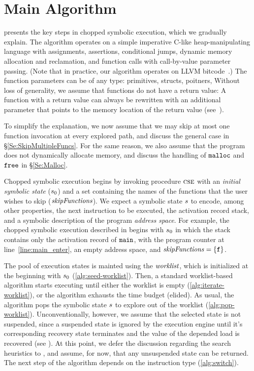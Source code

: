 
\section{Main Algorithm}\label{section:main-algorithm}

 presents the key steps in chopped
symbolic execution, which we gradually explain. The algorithm operates
on a simple imperative C-like heap-manipulating language with
assignments, assertions, conditional jumps, dynamic memory allocation
and reclamation, and function calls with call-by-value parameter
passing.
(Note that in practice, our algorithm operates on LLVM bitcode~\cite{llvm}.)
The function parameters can be of any type: primitives, structs, poitners, \etc
Without loss of generality, we assume that functions do not have a return value:
A function with a return value can always be rewritten with an additional parameter 
that points to the memory location of the return value (see~).

To simplify the explanation, we now
assume that we may skip at most one function invocation at every
explored path, and discuss the general case in
\S\ref{Se:SkipMultipleFuncs}. For the same reason, we also assume that
the program does not dynamically allocate memory, and discuss the
handling of $\texttt{malloc}$ and $\texttt{free}$ in \S\ref{Se:Malloc}.

Chopped symbolic execution begins by invoking procedure $\textsc{cse}$
with an \emph{initial symbolic state} ($s_0$) and a set
containing the names of the functions that the user wishes to skip
($\mathit{skipFunctions}$). We expect a symbolic state $s$ to encode,
among other properties, the next instruction to be executed, the activation record stack,
and a symbolic description of the program \emph{address space}. For example, the
chopped symbolic execution described in  begins
with $s_0$ in which the stack contains only the activation record
of $\texttt{main}$, with the program counter at
line~\ref{line:main_enter}, an empty address space, and
$\mathit{skipFunctions} = \{ \texttt{f} \}$.

The pool of execution states is mainted using the $\mathit{worklist}$,
which is initialized at the beginning with $s_0$ (\cref{alg:seed-worklist}).
Then, a standard worklist-based algorithm starts executing until either the
worklist is empty (\cref{alg:iterate-worklist}), or the algorithm
exhausts the time budget (elided). As usual, the algorithm pops the
symbolic state $s$ to explore out of the worklist
(\cref{alg:pop-worklist}).
Unconventionally, however, we assume that
the selected state is not suspended, since a suspended state is ignored by the execution engine
until it's corresponding recovery state terminates
and the value of the depended load is recovered (see ).
At this point, we defer the discussion regarding the search heuristics to ,
and assume, for now, that any unsuspended state can be returned.
The next step of the algorithm depends on the instruction type (\cref{alg:switch}).

